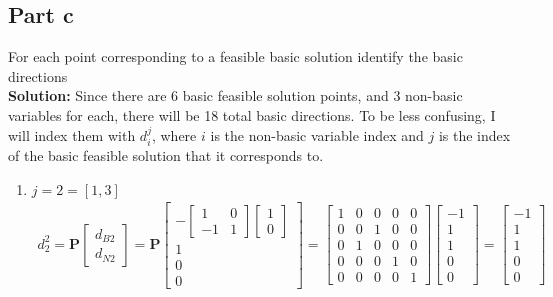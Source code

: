 \documentclass[11pt]{article}
\begin{document}
\subsection{Part c}
For each point corresponding to a feasible basic solution identify the basic directions
\\
\textbf{Solution: }
Since there are 6 basic feasible solution points, and 3 non-basic variables for each, there will be 18 total basic directions.
To be less confusing, I will index them with $d_i^j$, where $i$ is the non-basic variable index and $j$ is the index of the basic feasible solution that it corresponds to.
\begin{enumerate}
    \item $j = 2 = [1,3]$
    \begin{align*} 
        d_2^2 = \textbf{P}
      \begin{bmatrix}
         d_{B2} \\ d_{N2}
      \end{bmatrix}
      =
      \textbf{P}
      \begin{bmatrix}
        -
        \begin{bmatrix}
         1 & 0 \\ -1 & 1   
        \end{bmatrix}
        \begin{bmatrix}
            1 \\ 0
        \end{bmatrix} \\
        1 \\ 0 \\ 0
      \end{bmatrix}
      = 
      \begin{bmatrix}
        1 & 0 & 0 & 0 & 0 \\
        0 & 0 & 1 & 0 & 0 \\
        0 & 1 & 0 & 0 & 0 \\
        0 & 0 & 0 & 1 & 0 \\
        0 & 0 & 0 & 0 & 1
      \end{bmatrix}
      \begin{bmatrix}
        -1 \\ 1 \\ 1 \\ 0 \\ 0 
      \end{bmatrix}
      =
      \begin{bmatrix}
        -1 \\ 1 \\ 1 \\ 0 \\ 0 

\end{bmatrix}
\end{align*}
\end{enumerate}
\end{document}
